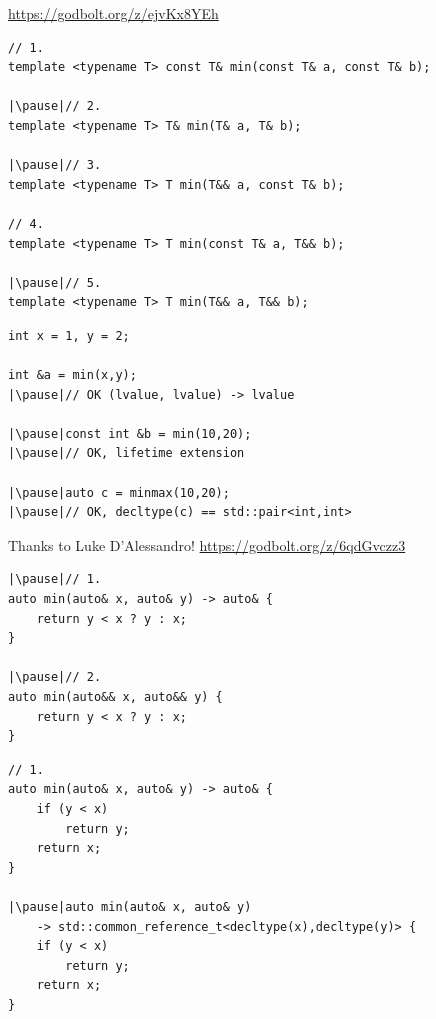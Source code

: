\documentclass[aspectratio=169]{beamer}
\begin{document}
\begin{frame}[fragile]{}
\begin{flushright}\small\href{https://godbolt.org/z/ejvKx8YEh}{https://godbolt.org/z/ejvKx8YEh}\end{flushright}
\begin{verbatim}
// 1.
template <typename T> const T& min(const T& a, const T& b);

|\pause|// 2.
template <typename T> T& min(T& a, T& b);

|\pause|// 3.
template <typename T> T min(T&& a, const T& b);

// 4.
template <typename T> T min(const T& a, T&& b);

|\pause|// 5.
template <typename T> T min(T&& a, T&& b);
\end{verbatim}
\end{frame}

\begin{frame}[fragile]{}
\begin{verbatim}
int x = 1, y = 2;

int &a = min(x,y);
|\pause|// OK (lvalue, lvalue) -> lvalue

|\pause|const int &b = min(10,20);
|\pause|// OK, lifetime extension

|\pause|auto c = minmax(10,20);
|\pause|// OK, decltype(c) == std::pair<int,int>
\end{verbatim}
\end{frame}

\begin{frame}[fragile]{}
Thanks to Luke D'Alessandro!
\href{https://godbolt.org/z/6qdGvczz3}{https://godbolt.org/z/6qdGvczz3}
\begin{verbatim}
|\pause|// 1.
auto min(auto& x, auto& y) -> auto& {
    return y < x ? y : x;
}

|\pause|// 2.
auto min(auto&& x, auto&& y) {
    return y < x ? y : x;
}
\end{verbatim}
\end{frame}

\begin{frame}[fragile]{}
\begin{small}
\begin{verbatim}
// 1.
auto min(auto& x, auto& y) -> auto& {
    if (y < x)
        return y;
    return x;
}

|\pause|auto min(auto& x, auto& y)
    -> std::common_reference_t<decltype(x),decltype(y)> {
    if (y < x)
        return y;
    return x;
}
\end{verbatim}
\end{small}
\end{frame}
\end{document}
